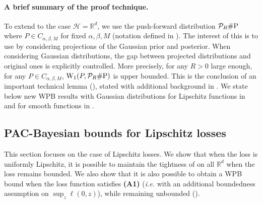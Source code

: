 \paragraph{A brief summary of the proof technique.} To extend  to the case $\mathcal{H}=\mathbb{R}^d$, we use the push-forward distribution $\mathcal{P}_{R} \# \P$ where $P\in C_{\alpha,\beta,M}$ for fixed $\alpha,\beta,M$ (notation defined in ).
The interest of this is to use  by considering projections of the Gaussian prior and posterior. When considering Gaussian distributions, the gap between projected distributions and original ones is explicitly controlled.
More precisely, for any $R>0$ large enough, for any $P\in C_{\alpha,\beta, M}$, $\W_{1}(P, \mathcal{P}_{R}\# \P)$ is upper bounded. This is the conclusion of an important technical lemma (), stated with additional background in .
We state below new WPB results with Gaussian distributions for Lipschitz functions in  and for smooth functions in .

\subsection{PAC-Bayesian bounds for Lipschitz losses}
\label{sec: main_sec_gaussian_lpz}

This section focuses on the case of Lipschitz losses. We show that when the loss is uniformly Lipschitz, it is possible to maintain the tightness of  on all $\mathbb{R}^d$ when the loss remains bounded. We also show that it is also possible to obtain a WPB bound when the loss function satisfies \textbf{(A1)} (\emph{i.e.} with an additional boundedness assumption on $\sup_{z} \ell(0,z)$), while remaining unbounded ().


